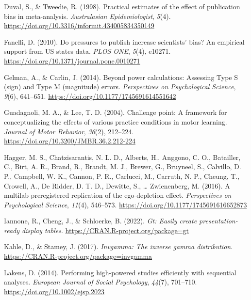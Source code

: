 \documentclass[
  doc, donotrepeattitle,floatsintext]{apa7}
\newlength{\cslhangindent}
\newlength{\cslentryspacingunit} %
\newenvironment{CSLReferences}[2] %
 {%
  \setlength{\parindent}{0pt}
  \ifodd #1
  \let\oldpar\par
  \def\par{\hangindent=\cslhangindent\oldpar}
  \fi
  \setlength{\parskip}{#2\cslentryspacingunit}
 }%
 {}
\begin{document}
\begin{CSLReferences}{1}{0}
\leavevmode{}%
Duval, S., \& Tweedie, R. (1998). Practical estimates of the effect of publication bias in meta-analysis. \emph{Australasian Epidemiologist}, \emph{5}(4). \url{https://doi.org/10.3316/informit.434005834350149}

\leavevmode{}%
Fanelli, D. (2010). Do pressures to publish increase scientists' bias? An empirical support from US states data. \emph{PLOS ONE}, \emph{5}(4), e10271. \url{https://doi.org/10.1371/journal.pone.0010271}

\leavevmode{}%
Gelman, A., \& Carlin, J. (2014). Beyond power calculations: {Assessing Type S} (sign) and {Type M} (magnitude) errors. \emph{Perspectives on Psychological Science}, \emph{9}(6), 641--651. \url{https://doi.org/10.1177/1745691614551642}

\leavevmode{}%
Guadagnoli, M. A., \& Lee, T. D. (2004). Challenge point: A framework for conceptualizing the effects of various practice conditions in motor learning. \emph{Journal of Motor Behavior}, \emph{36}(2), 212--224. \url{https://doi.org/10.3200/JMBR.36.2.212-224}

\leavevmode{}%
Hagger, M. S., Chatzisarantis, N. L. D., Alberts, H., Anggono, C. O., Batailler, C., Birt, A. R., Brand, R., Brandt, M. J., Brewer, G., Bruyneel, S., Calvillo, D. P., Campbell, W. K., Cannon, P. R., Carlucci, M., Carruth, N. P., Cheung, T., Crowell, A., De Ridder, D. T. D., Dewitte, S., \ldots{} Zwienenberg, M. (2016). A multilab preregistered replication of the ego-depletion effect. \emph{Perspectives on Psychological Science}, \emph{11}(4), 546--573. \url{https://doi.org/10.1177/1745691616652873}

\leavevmode{}%
Iannone, R., Cheng, J., \& Schloerke, B. (2022). \emph{Gt: Easily create presentation-ready display tables}. \url{https://CRAN.R-project.org/package=gt}

\leavevmode{}%
Kahle, D., \& Stamey, J. (2017). \emph{Invgamma: The inverse gamma distribution}. \url{https://CRAN.R-project.org/package=invgamma}

\leavevmode{}%
Lakens, D. (2014). Performing high-powered studies efficiently with sequential analyses. \emph{European Journal of Social Psychology}, \emph{44}(7), 701--710. \url{https://doi.org/10.1002/ejsp.2023}


\end{CSLReferences}
\end{document}
